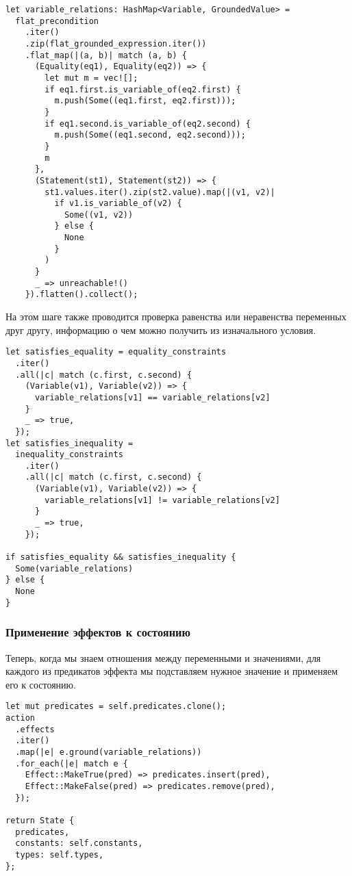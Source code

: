\documentclass{article}
\begin{document}
\begin{verbatim}
let variable_relations: HashMap<Variable, GroundedValue> =
  flat_precondition
    .iter()
    .zip(flat_grounded_expression.iter())
    .flat_map(|(a, b)| match (a, b) {
      (Equality(eq1), Equality(eq2)) => {
        let mut m = vec![];
        if eq1.first.is_variable_of(eq2.first) {
          m.push(Some((eq1.first, eq2.first)));
        }
        if eq1.second.is_variable_of(eq2.second) {
          m.push(Some((eq1.second, eq2.second)));
        }
        m
      },
      (Statement(st1), Statement(st2)) => {
        st1.values.iter().zip(st2.value).map(|(v1, v2)|
          if v1.is_variable_of(v2) {
            Some((v1, v2))
          } else {
            None
          }
        )
      }
      _ => unreachable!()
    }).flatten().collect();
\end{verbatim}

На этом шаге также проводится проверка равенства или неравенства переменных друг другу,
информацию о чем можно получить из изначального условия.

\begin{verbatim}
let satisfies_equality = equality_constraints
  .iter()
  .all(|c| match (c.first, c.second) {
    (Variable(v1), Variable(v2)) => {
      variable_relations[v1] == variable_relations[v2]
    }
    _ => true,
  });
let satisfies_inequality =
  inequality_constraints
    .iter()
    .all(|c| match (c.first, c.second) {
      (Variable(v1), Variable(v2)) => {
        variable_relations[v1] != variable_relations[v2]
      }
      _ => true,
    });

if satisfies_equality && satisfies_inequality {
  Some(variable_relations)
} else {
  None
}
\end{verbatim}


\subsubsection{Применение эффектов к состоянию}

Теперь, когда мы знаем отношения между переменными и значениями,
для каждого из предикатов эффекта мы подставляем нужное значение
и применяем его к состоянию.

\begin{verbatim}
let mut predicates = self.predicates.clone();
action
  .effects
  .iter()
  .map(|e| e.ground(variable_relations))
  .for_each(|e| match e {
    Effect::MakeTrue(pred) => predicates.insert(pred),
    Effect::MakeFalse(pred) => predicates.remove(pred),
  });

return State {
  predicates,
  constants: self.constants,
  types: self.types,
};
\end{verbatim}
\end{document}
